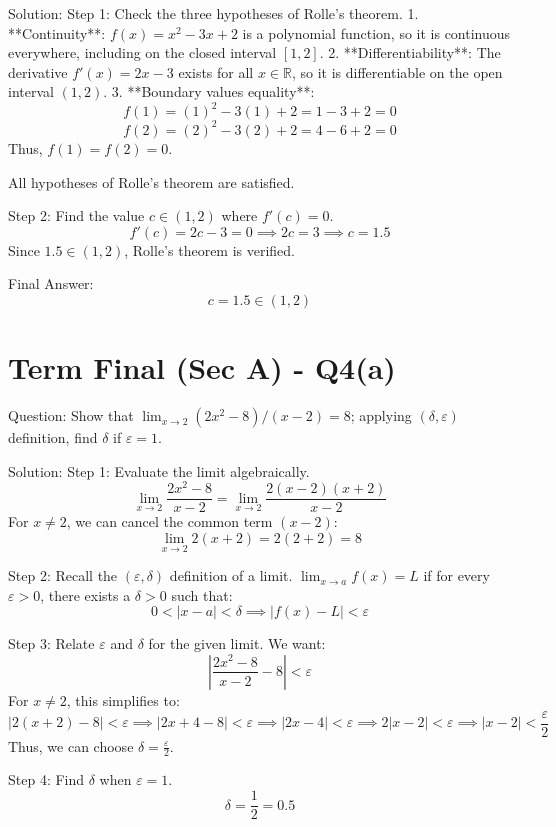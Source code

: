 \documentclass[11pt, a4paper]{article}
\begin{document}
Solution:
Step 1: Check the three hypotheses of Rolle's theorem.
1. **Continuity**: $f(x) = x^2 - 3x + 2$ is a polynomial function, so it is continuous everywhere, including on the closed interval $[1, 2]$.
2. **Differentiability**: The derivative $f'(x) = 2x - 3$ exists for all $x \in \mathbb{R}$, so it is differentiable on the open interval $(1, 2)$.
3. **Boundary values equality**:
   $$f(1) = (1)^2 - 3(1) + 2 = 1 - 3 + 2 = 0$$
   $$f(2) = (2)^2 - 3(2) + 2 = 4 - 6 + 2 = 0$$
   Thus, $f(1) = f(2) = 0$.

All hypotheses of Rolle's theorem are satisfied.

Step 2: Find the value $c \in (1, 2)$ where $f'(c) = 0$.
$$f'(c) = 2c - 3 = 0 \implies 2c = 3 \implies c = 1.5$$
Since $1.5 \in (1, 2)$, Rolle's theorem is verified.

Final Answer:
$$
\boxed{c = 1.5 \in (1,2)}
$$


\section*{Term Final (Sec A) - Q4(a)}
Question:
Show that $\lim_{x \to 2} (2x^2 - 8)/(x - 2) = 8$; applying $(\delta, \varepsilon)$ definition, find $\delta$ if $\varepsilon = 1$.

Solution:
Step 1: Evaluate the limit algebraically.
$$\lim_{x \to 2} \frac{2x^2 - 8}{x - 2} = \lim_{x \to 2} \frac{2(x-2)(x+2)}{x-2}$$
For $x \neq 2$, we can cancel the common term $(x-2)$:
$$\lim_{x \to 2} 2(x+2) = 2(2+2) = 8$$

Step 2: Recall the $(\varepsilon, \delta)$ definition of a limit.
$\lim_{x \to a} f(x) = L$ if for every $\varepsilon > 0$, there exists a $\delta > 0$ such that:
$$0 < |x - a| < \delta \implies |f(x) - L| < \varepsilon$$

Step 3: Relate $\varepsilon$ and $\delta$ for the given limit.
We want:
$$\left| \frac{2x^2 - 8}{x-2} - 8 \right| < \varepsilon$$
For $x \neq 2$, this simplifies to:
$$|2(x+2) - 8| < \varepsilon \implies |2x + 4 - 8| < \varepsilon \implies |2x - 4| < \varepsilon \implies 2|x-2| < \varepsilon \implies |x-2| < \frac{\varepsilon}{2}$$
Thus, we can choose $\delta = \frac{\varepsilon}{2}$.

Step 4: Find $\delta$ when $\varepsilon = 1$.
$$\delta = \frac{1}{2} = 0.5$$
\end{document}
